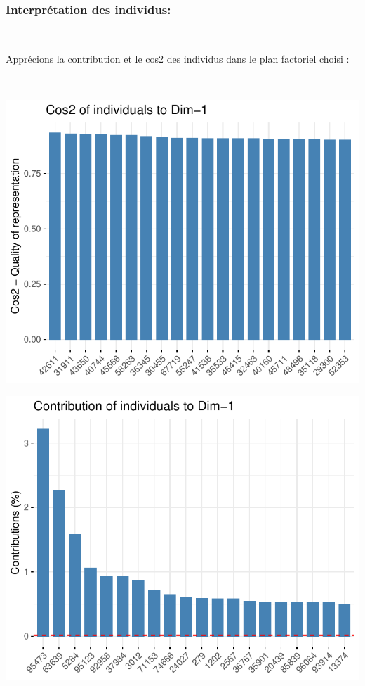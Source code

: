 \documentclass[]{imsart}
\numberwithin{equation}{section}
\theoremstyle{plain}
\begin{document}
~

\hypertarget{interpruxe9tation-des-individus}{%
\subsubsection{Interprétation des individus:}\label{interpruxe9tation-des-individus}}

~

Apprécions la contribution et le cos2 des individus dans le plan factoriel choisi :

~

\begin{flushleft}\includegraphics{Analyse_Exploratoire_Projet_files/figure-latex/unnamed-chunk-18-1} \end{flushleft}

\begin{flushleft}\includegraphics{Analyse_Exploratoire_Projet_files/figure-latex/unnamed-chunk-18-2} \end{flushleft}
\end{document}
